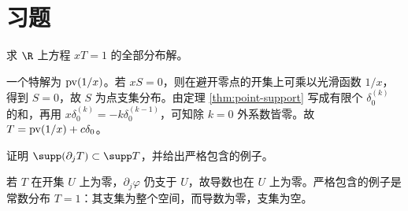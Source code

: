 \section{习题}
\begin{exercise}[除法的不唯一性]
求 $\R$ 上方程 $xT=1$ 的全部分布解。
\end{exercise}
\begin{solution}
一个特解为 $\operatorname{pv}(1/x)$。若 $xS=0$，则在避开零点的开集上可乘以光滑函数 $1/x$，得到 $S=0$，故 $S$ 为点支集分布。由定理 \ref{thm:point-support} 写成有限个 $\delta_0^{(k)}$ 的和，再用 $x\delta_0^{(k)}=-k\delta_0^{(k-1)}$，可知除 $k=0$ 外系数皆零。故 $T=\operatorname{pv}(1/x)+c\delta_0$。
\end{solution}
\begin{exercise}[阶数与支集]
证明 $\supp(\partial_jT)\subset\supp T$，并给出严格包含的例子。
\end{exercise}
\begin{solution}
若 $T$ 在开集 $U$ 上为零，$\partial_j\varphi$ 仍支于 $U$，故导数也在 $U$ 上为零。严格包含的例子是常数分布 $T=1$：其支集为整个空间，而导数为零，支集为空。
\end{solution}
